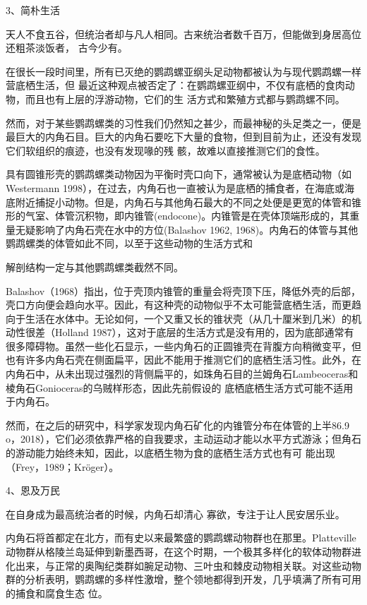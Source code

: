 \documentclass{article}
\begin{document}
3、简朴生活 

天人不食五谷，但统治者却与凡人相同。古来统治者数千百万，但能做到身居高位还粗茶淡饭者，
古今少有。 

在很长一段时间里，所有已灭绝的鹦鹉螺亚纲头足动物都被认为与现代鹦鹉螺一样营底栖生活，但
\newpage
最近这种观点被否定了：在鹦鹉螺亚纲中，不仅有底栖的食肉动物，而且也有上层的浮游动物，它们的生
活方式和繁殖方式都与鹦鹉螺不同。 

然而，对于某些鹦鹉螺类的习性我们仍然知之甚少，而最神秘的头足类之一，便是最巨大的内角石目。巨大的内角石要吃下大量的食物，但到目前为止，还没有发现它们软组织的痕迹，也没有发现喙的残
骸，故难以直接推测它们的食性。 

具有圆锥形壳的鹦鹉螺类动物因为平衡时壳口向下，通常被认为是底栖动物（如Westermann 1998），在过去，内角石也一直被认为是底栖的捕食者，在海底或海底附近捕捉小动物。但是，内角石与其他角石最大的不同之处便是更宽的体管和锥形的气室、体管沉积物，即内锥管(endocone)。内锥管是在壳体顶端形成的，其重量无疑影响了内角石壳在水中的方位(Balashov 1962, 1968)。内角石的体管与其他鹦鹉螺类的体管如此不同，以至于这些动物的生活方式和

\newpage
解剖结构一定与其他鹦鹉螺类截然不同。 

Balashov（1968）指出，位于壳顶内锥管的重量会将壳顶下压，降低外壳的后部，壳口方向便会趋向水平。因此，有这种壳的动物似乎不太可能营底栖生活，而更趋向于生活在水体中。无论如何，一个又重又长的锥状壳（从几十厘米到几米）的机动性很差（Holland 1987），这对于底层的生活方式是没有用的，因为底部通常有很多障碍物。虽然一些化石显示，一些内角石的正圆锥壳在背腹方向稍微变平，但也有许多内角石壳在侧面扁平，因此不能用于推测它们的底栖生活习性。此外，在内角石中，从未出现过强烈的背侧扁平的，如珠角石目的兰姆角石Lambeoceras和棱角石Gonioceras的乌贼样形态，因此先前假设的
底栖底栖生活方式可能不适用于内角石。 

然而，在之后的研究中，科学家发现内角石矿化的内锥管分布在体管的上半86.9%
\newpage
o，2018），它们必须依靠严格的自我要求，主动运动才能以水平方式游泳；但角石的游动能力始终未知，因此，以底栖生物为食的底栖生活方式也有可
能出现（Frey，1989；Kröger）。 


4、恩及万民 

在自身成为最高统治者的时候，内角石却清心
寡欲，专注于让人民安居乐业。 

内角石将首都定在北方，而有史以来最繁盛的鹦鹉螺动物群也在那里。Platteville动物群从格陵兰岛延伸到新墨西哥，在这个时期，一个极其多样化的软体动物群进化出来，与正常的奥陶纪类群如腕足动物、三叶虫和棘皮动物相关联。对这些动物群的分析表明，鹦鹉螺的多样性激增，整个领地都得到开发，几乎填满了所有可用的捕食和腐食生态
位。 
\end{document}

